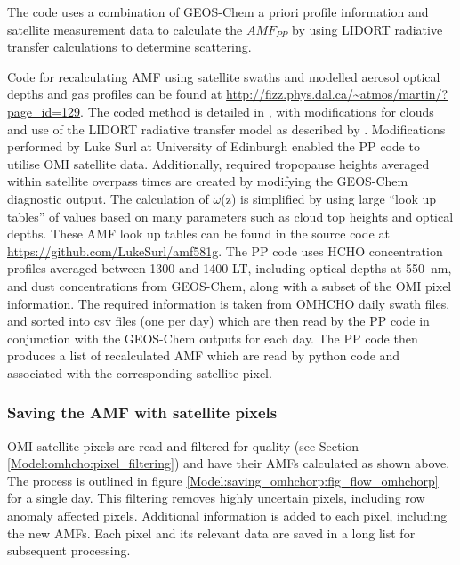       The code uses a combination of GEOS-Chem a priori profile information and satellite measurement data to calculate the $AMF_{PP}$ by using LIDORT radiative transfer calculations to determine scattering.
      
      
      Code for recalculating AMF using satellite swaths and modelled aerosol optical depths and gas profiles can be found at \url{http://fizz.phys.dal.ca/~atmos/martin/?page_id=129}. 
      The coded method is detailed in \textcite{Palmer2001}, with modifications for clouds and use of the LIDORT radiative transfer model \parencite{Spurr2002} as described by \textcite{Martin2003}.
      Modifications performed by Luke Surl at University of Edinburgh enabled the PP code to utilise OMI satellite data.
      Additionally, required tropopause heights averaged within satellite overpass times are created by modifying the GEOS-Chem diagnostic output.
      The calculation of $\omega$(z) is simplified by using large ``look up tables'' of values based on many parameters such as cloud top heights and optical depths.
      These AMF look up tables can be found in the source code at \url{https://github.com/LukeSurl/amf581g}.
      The PP code uses HCHO concentration profiles averaged between 1300 and 1400 LT, including optical depths at 550~nm, and dust concentrations from GEOS-Chem, along with a subset of the OMI pixel information.
      The required information is taken from OMHCHO daily swath files, and sorted into csv files (one per day) which are then read by the PP code in conjunction with the GEOS-Chem outputs for each day.
      The PP code then produces a list of recalculated AMF which are read by python code and associated with the corresponding satellite pixel.
    
    
      
    \subsubsection{Saving the AMF with satellite pixels}
      
      OMI satellite pixels are read and filtered for quality (see Section \ref{Model:omhcho:pixel_filtering}) and have their AMFs calculated as shown above. 
      The process is outlined in figure  \ref{Model:saving_omhchorp:fig_flow_omhchorp} for a single day.
      This filtering removes highly uncertain pixels, including row anomaly affected pixels.
      Additional information is added to each pixel, including the new AMFs.
      Each pixel and its relevant data are saved in a long list for subsequent processing.
    

